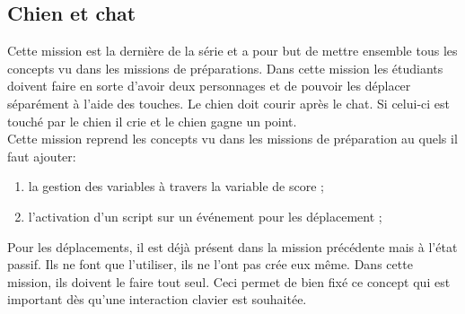 \subsection{Chien et chat}
Cette mission est la dernière de la série et a pour but de mettre ensemble tous les concepts vu dans les missions de préparations. Dans cette mission les étudiants doivent faire en sorte d'avoir deux personnages et de pouvoir les déplacer séparément à l'aide des touches. Le chien doit courir après le chat. Si celui-ci est touché par le chien il crie et le chien gagne un point.\\

Cette mission reprend les concepts vu dans les missions de préparation au quels il faut ajouter:
\begin{enumerate}
\item la gestion des variables à travers la variable de score ;
\item l'activation d'un script sur un événement pour les déplacement ;
\end{enumerate}

Pour les déplacements, il est déjà présent dans la mission précédente mais à l'état passif. Ils ne font que l'utiliser, ils ne l'ont pas crée eux même. Dans cette mission, ils doivent le faire tout seul. Ceci permet de bien fixé ce concept qui est important dès qu'une interaction clavier est souhaitée.

